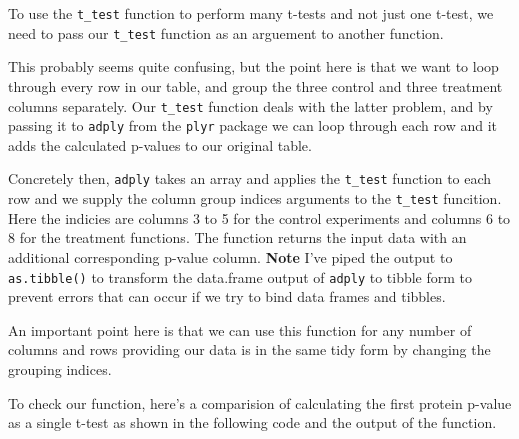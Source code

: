 \documentclass[12pt,]{book}
\newenvironment{Shaded}{\begin{snugshade}}{\end{snugshade}}
\newcommand{\KeywordTok}[1]{\textcolor[rgb]{0.13,0.29,0.53}{\textbf{#1}}}
\newcommand{\DataTypeTok}[1]{\textcolor[rgb]{0.13,0.29,0.53}{#1}}
\newcommand{\DecValTok}[1]{\textcolor[rgb]{0.00,0.00,0.81}{#1}}
\newcommand{\StringTok}[1]{\textcolor[rgb]{0.31,0.60,0.02}{#1}}
\newcommand{\CommentTok}[1]{\textcolor[rgb]{0.56,0.35,0.01}{\textit{#1}}}
\newcommand{\OperatorTok}[1]{\textcolor[rgb]{0.81,0.36,0.00}{\textbf{#1}}}
\newcommand{\NormalTok}[1]{#1}
\theoremstyle{definition}
\theoremstyle{definition}
\theoremstyle{definition}
\theoremstyle{remark}
\begin{document}
To use the \texttt{t\_test} function to perform many t-tests and not
just one t-test, we need to pass our \texttt{t\_test} function as an
arguement to another function.

This probably seems quite confusing, but the point here is that we want
to loop through every row in our table, and group the three control and
three treatment columns separately. Our \texttt{t\_test} function deals
with the latter problem, and by passing it to \texttt{adply} from the
\texttt{plyr} package we can loop through each row and it adds the
calculated p-values to our original table.

Concretely then, \texttt{adply} takes an array and applies the
\texttt{t\_test} function to each row and we supply the column group
indices arguments to the \texttt{t\_test} funcition. Here the indicies
are columns 3 to 5 for the control experiments and columns 6 to 8 for
the treatment functions. The function returns the input data with an
additional corresponding p-value column. \textbf{Note} I've piped the
output to \texttt{as.tibble()} to transform the data.frame output of
\texttt{adply} to tibble form to prevent errors that can occur if we try
to bind data frames and tibbles.

An important point here is that we can use this function for any number
of columns and rows providing our data is in the same tidy form by
changing the grouping indices.

\begin{Shaded}
\end{Shaded}

To check our function, here's a comparision of calculating the first
protein p-value as a single t-test as shown in the following code and
the output of the function.
\end{document}
